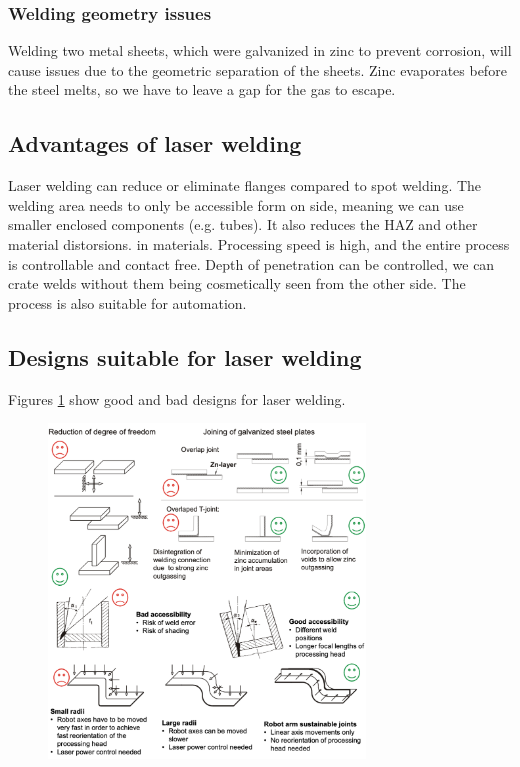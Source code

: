 \subsubsection{Welding geometry issues}
Welding two metal sheets, which were galvanized in zinc to prevent corrosion,
will cause issues due to the geometric separation of the sheets. Zinc evaporates before the steel melts, so 
we have to leave a gap for the gas to escape.

\subsection{Advantages of laser welding}
Laser welding can reduce or eliminate flanges compared to spot welding. The welding area needs to only be
accessible form on side, meaning we can use smaller enclosed components (e.g. tubes). It also reduces the HAZ and other material distorsions.
in materials. Processing speed is high, and the entire process is controllable and contact free. Depth of penetration can be controlled, we can crate 
welds without them being cosmetically seen from the other side. 
The process is also suitable for automation.


\subsection{Designs suitable for laser welding}
Figures \ref{fig:ge1} show good and bad designs for laser welding.

\begin{figure}[h!]
    \centering
    \includegraphics[width=0.75\textwidth]{slike/ge.png}
    \caption{}
    \label{fig:ge1}
\end{figure}

